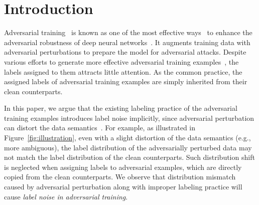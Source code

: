 \section{Introduction}





Adversarial training~\citep{Goodfellow2015ExplainingAH, Huang2015LearningWA, Kurakin2017AdversarialML, Madry2018TowardsDL} is known as one of the most effective ways~\citep{Athalye2018ObfuscatedGG, Uesato2018AdversarialRA} to enhance the adversarial robustness of deep neural networks~\citep{Szegedy2014IntriguingPO, Goodfellow2015ExplainingAH}. 
It augments training data with adversarial perturbations to prepare the model for adversarial attacks. 
Despite various efforts to generate more effective adversarial training examples~\citep{Ding2020MaxMarginA, Zhang2020AttacksWD},
the labels assigned to them attracts little attention. 
As the common practice, the assigned labels of adversarial training examples are simply inherited from their clean counterparts. 

In this paper, we argue that the existing labeling practice of the adversarial training examples introduces label noise implicitly, since adversarial perturbation can distort the data semantics~\citep{Tsipras2019RobustnessMB, Ilyas2019AdversarialEA}.
For example, as illustrated in Figure~\ref{fig:illustration}, even with a slight distortion of the data semantics (e.g., more ambiguous), the label distribution of the adversarially perturbed data may not match the label distribution of the clean counterparts.
Such distribution shift is neglected when assigning labels to adversarial examples, which are directly copied from the clean counterparts.
We observe that distribution mismatch caused by adversarial perturbation along with improper labeling practice will cause \emph{label noise
in adversarial training}.


